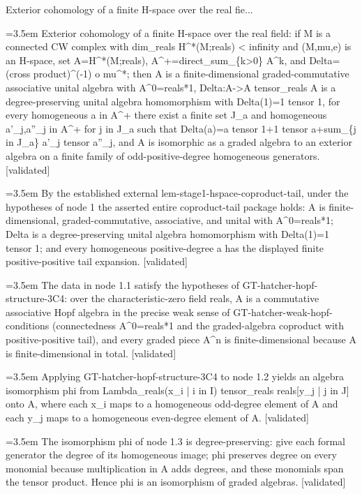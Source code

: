 \documentclass{article}
\newcommand{\step}[1]{\par\noindent\hangindent=3.5em\hangafter=1%
  \makebox[3.5em][l]{\textbf{#1.}}}
\newcommand{\steptag}[1]{\hfill{\small\textsf{[#1]}}}
\begin{document}
\begin{proofbox}{Exterior cohomology of a finite H-space over the real fie...}
\step{1} Exterior cohomology of a finite H-space over the real field: if M is a connected CW complex with dim\_reals H\textasciicircum{}*(M;reals) < infinity and (M,mu,e) is an H-space, set A=H\textasciicircum{}*(M;reals), A\textasciicircum{}+=direct\_sum\_\{k>0\} A\textasciicircum{}k, and Delta=(cross product)\textasciicircum{}(-1) o mu\textasciicircum{}*; then A is a finite-dimensional graded-commutative associative unital algebra with A\textasciicircum{}0=reals*1, Delta:A->A tensor\_reals A is a degree-preserving unital algebra homomorphism with Delta(1)=1 tensor 1, for every homogeneous a in A\textasciicircum{}+ there exist a finite set J\_a and homogeneous a'\_j,a''\_j in A\textasciicircum{}+ for j in J\_a such that Delta(a)=a tensor 1+1 tensor a+sum\_\{j in J\_a\} a'\_j tensor a''\_j, and A is isomorphic as a graded algebra to an exterior algebra on a finite family of odd-positive-degree homogeneous generators. \steptag{validated} \\[6pt]
\step{1.1} By the established external lem-stage1-hspace-coproduct-tail, under the hypotheses of node 1 the asserted entire coproduct-tail package holds: A is finite-dimensional, graded-commutative, associative, and unital with A\textasciicircum{}0=reals*1; Delta is a degree-preserving unital algebra homomorphism with Delta(1)=1 tensor 1; and every homogeneous positive-degree a has the displayed finite positive-positive tail expansion. \steptag{validated} \\[4pt]
\step{1.2} The data in node 1.1 satisfy the hypotheses of GT-hatcher-hopf-structure-3C4: over the characteristic-zero field reals, A is a commutative associative Hopf algebra in the precise weak sense of GT-hatcher-weak-hopf-conditions (connectedness A\textasciicircum{}0=reals*1 and the graded-algebra coproduct with positive-positive tail), and every graded piece A\textasciicircum{}n is finite-dimensional because A is finite-dimensional in total. \steptag{validated} \\[4pt]
\step{1.3} Applying GT-hatcher-hopf-structure-3C4 to node 1.2 yields an algebra isomorphism phi from Lambda\_reals(x\_i | i in I) tensor\_reals reals[y\_j | j in J] onto A, where each x\_i maps to a homogeneous odd-degree element of A and each y\_j maps to a homogeneous even-degree element of A. \steptag{validated} \\[4pt]
\step{1.4} The isomorphism phi of node 1.3 is degree-preserving: give each formal generator the degree of its homogeneous image; phi preserves degree on every monomial because multiplication in A adds degrees, and these monomials span the tensor product. Hence phi is an isomorphism of graded algebras. \steptag{validated} \\[4pt]

\end{proofbox}
\end{document}
